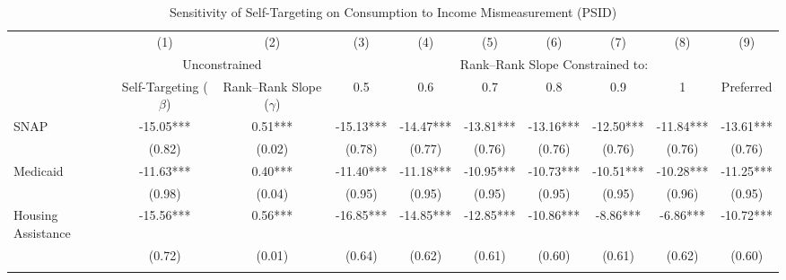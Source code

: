 \begin{table}[]     \footnotesize     \centering
\caption{Sensitivity of Self-Targeting on Consumption to Income Mismeasurement (PSID)}
\label{tab:constrained_reg_c}
\begin{tabular*}{1.36\textwidth}{@{\extracolsep{\fill}}lccccccccc}
\toprule
                   & (1)                               & (2)                               & (3)                             & (4)                             & (5)                             & (6)                             & (7)                             & (8)                             & (9) \\
                   & \multicolumn{2}{c}{Unconstrained} & \multicolumn{7}{c}{Rank--Rank Slope Constrained to:} \\
\cmidrule{2-3}\cmidrule{4-10}
                   & Self-Targeting ($\beta$)          & Rank--Rank Slope ($\gamma$)       & 0.5                             & 0.6                             & 0.7                             & 0.8                             & 0.9                             & 1                               & Preferred \\
\midrule
\addlinespace
SNAP               & -15.05***        & 0.51***        & -15.13***        & -14.47***        & -13.81***        & -13.16***        & -12.50***        & -11.84***        & -13.61*** \\
                   & (0.82)            & (0.02)            & (0.78)            & (0.77)            & (0.76)            & (0.76)            & (0.76)            & (0.76)            & (0.76)     \\
\addlinespace
Medicaid           & -11.63***    & 0.40***    & -11.40***    & -11.18***    & -10.95***    & -10.73***    & -10.51***    & -10.28***    & -11.25*** \\
                   & (0.98)        & (0.04)        & (0.95)        & (0.95)        & (0.95)        & (0.95)        & (0.95)        & (0.96)        & (0.95)     \\
\addlinespace
Housing Assistance & -15.56***          & 0.56***          & -16.85***          & -14.85***          & -12.85***          & -10.86***          & -8.86***          & -6.86***          & -10.72*** \\
                   & (0.72)              & (0.01)              & (0.64)              & (0.62)              & (0.61)              & (0.60)              & (0.61)              & (0.62)              & (0.60)     \\
\addlinespace

\end{tabular*}
\end{table}
